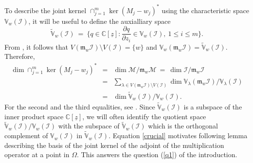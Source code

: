 \documentclass[11pt]{amsart}
\theoremstyle{definition}
\numberwithin{equation}{section}
\begin{document}
To describe the joint kernel $\cap_{j=1}^m\ker (M_j -w_j )^*$ using the characteristic space $\mathbb V_w(\mathcal I)$, it will be useful to define the auxialliary space 
$$
\tilde{\mathbb V}_{w}(\mathcal I)~=~\{q\in{{\mathbb C}}[\underline z]: \frac{\partial q}{\partial z_i}\in
\mathbb V_{w}(\mathcal I),\: 1\leq i\leq m\}.
$$ 
From \cite[Lemma 3.4]{bmp}, it follows that $V(\mathfrak m_w\mathcal I)\setminus V(\mathcal I) =\{w\}$ and $\mathbb V_w(\mathfrak m_w\mathcal I) = \tilde{\mathbb V}_{w}(\mathcal I)$.  Therefore,
\begin{eqnarray}  \label{crucial}
\dim \cap_{j=1}^m\ker (M_j -w_j )^*&=& \dim \mathcal M/\mathfrak m_w\mathcal M   ~=~\dim \mathcal I/\mathfrak m_w\mathcal I \\ &=&\sum_{\lambda\in V(\mathfrak m_w\mathcal I)\setminus V(\mathcal I)} \dim \mathbb V_\lambda(\mathfrak m_w\mathcal I)/\mathbb V_\lambda(\mathcal I) \nonumber \\ &=& \dim \tilde{\mathbb V}_{w}(\mathcal I)/\mathbb V_w(\mathcal I)\nonumber.
\end{eqnarray}
For the second and the third equalities, see \cite[Theorem 2.2.5 and 2.1.7]{cg}. Since $\tilde{\mathbb V}_{w}(\mathcal I)$ is a subspace of the inner product space ${{\mathbb C}}[\underline{z}]$, we will often identify the quotient space $\tilde{\mathbb V}_{w}(\mathcal I)/\mathbb V_w(\mathcal I)$ with the subspace of $\tilde{\mathbb V}_{w}(\mathcal I)$ which is the orthogonal complement of $\mathbb V_w(\mathcal I)$ in $\tilde{\mathbb V}_{w}(\mathcal I)$. Equation \eqref{crucial} motivates following lemma describing the basis of the joint kernel of the adjoint of the multiplication operator at a point in $\Omega$. This answers the question (\ref{q1}) of the introduction.
\end{document}
